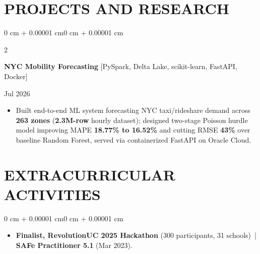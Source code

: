 \documentclass[10pt, letterpaper]{article}
\newenvironment{highlights}{
    \begin{itemize}[
        topsep=0.10 cm,
        parsep=0.06 cm,
        partopsep=0pt,
        itemsep=0.06 cm,
        leftmargin=12pt
    ]
}{
    \end{itemize}
}
\newenvironment{onecolentry}{
    \begin{adjustwidth}{0 cm + 0.00001 cm}{0 cm + 0.00001 cm}
}{
    \end{adjustwidth}
}
\newenvironment{twocolentry}[2][]{
    \onecolentry
    \def\secondColumn{#2}
    \setcolumnwidth{\fill, 4.5 cm}
    \begin{paracol}{2}
}{
    \switchcolumn \raggedleft \secondColumn
    \end{paracol}
    \endonecolentry
}
\begin{document}
\section{PROJECTS AND RESEARCH}
\begin{twocolentry}{Jul 2026}
\textbf{NYC Mobility Forecasting} [PySpark, Delta Lake, scikit-learn, FastAPI, Docker]
\end{twocolentry}
\begin{highlights}
  \item Built end-to-end ML system forecasting NYC taxi/rideshare demand across \textbf{263 zones} (\textbf{2.3M-row} hourly dataset); designed two-stage Poisson hurdle model improving MAPE \textbf{18.77\% to 16.52\%} and cutting RMSE \textbf{43\%} over baseline Random Forest, served via containerized FastAPI on Oracle Cloud.
\end{highlights}

\section{EXTRACURRICULAR ACTIVITIES}
\begin{onecolentry}
\begin{highlights}
  \item \textbf{Finalist, RevolutionUC 2025 Hackathon} (300 participants, 31 schools) \,|\, \textbf{SAFe Practitioner 5.1} (Mar 2023).
\end{highlights}
\end{onecolentry}
\end{document}
